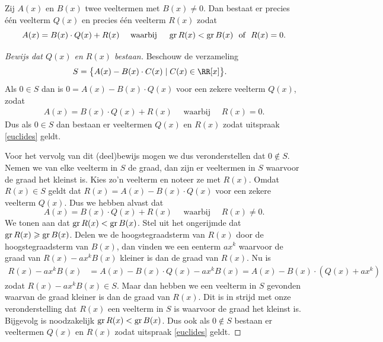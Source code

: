 \documentclass{ximera}
\begin{document}
\begin{stelling}
Zij $A(x)$ en $B(x)$ twee veeltermen met $B(x) \neq 0$. Dan bestaat er precies \'e\'en veelterm $Q(x)$ en precies \'e\'en veelterm $R(x)$ zodat
\begin{equation} \label{euclides}
A(x) = B(x)\cdot Q(x) + R(x) \quad \text{ waarbij } \quad \operatorname{gr} R(x) < \operatorname{gr} B(x) \,\, \text{ of } \,\, R(x) = 0.
\end{equation}
\end{stelling}
\begin{Uitbreiding}
\begin{proof}[Bewijs dat $Q(x)$ en $R(x)$ bestaan] Beschouw de verzameling 
\begin{align*}
S & = \bigl\{ A(x) - B(x)\cdot C(x) \mid C(x) \in \RR[x] \bigr\}.  
\end{align*}
Als $0 \in S$ dan is $0 = A(x) - B(x)\cdot Q(x)$ voor een zekere veelterm $Q(x)$, zodat \begin{align*}
A(x) = B(x)\cdot Q(x) + R(x) \quad \text{ waarbij } \quad R(x) = 0.
\end{align*}
Dus als $0 \in S$ dan bestaan er veeltermen $Q(x)$ en $R(x)$ zodat uitspraak \eqref{euclides} geldt. 

Voor het vervolg van dit (deel)bewijs mogen we dus veronderstellen dat $0 \not\in S$. Nemen we van elke veelterm in $S$ de graad, dan zijn er veeltermen in $S$ waarvoor de graad het kleinst is. Kies zo'n veelterm en noteer ze met $R(x)$. Omdat $R(x) \in S$ geldt dat $R(x) = A(x) - B(x)\cdot Q(x)$ voor een zekere veelterm $Q(x)$. Dus we hebben alvast dat
\[
A(x) = B(x)\cdot Q(x) + R(x) \quad \text{ waarbij } \quad R(x) \neq 0.
\]
We tonen aan dat $\operatorname{gr} R(x) < \operatorname{gr} B(x)$. Stel uit het ongerijmde dat $\operatorname{gr} R(x) \geqslant \operatorname{gr} B(x)$. Delen we de hoogstegraadsterm van $R(x)$ door de hoogstegraadsterm van $B(x)$, dan vinden we een eenterm $ax^k$ waarvoor de graad van $R(x) - ax^k B(x)$ kleiner is dan de graad van $R(x)$. Nu is
\begin{align*}
R(x) - ax^k B(x) & = A(x) - B(x)\cdot Q(x) - ax^k B(x) = A(x) - B(x)\cdot (Q(x) + ax^k) 
\end{align*}
zodat $R(x) - ax^k B(x) \in S$. Maar dan hebben we een veelterm in $S$ gevonden waarvan de graad kleiner is dan de graad van $R(x)$. Dit is in strijd  met onze veronderstelling dat $R(x)$ een veelterm in $S$ is waarvoor de graad het kleinst is. Bijgevolg is noodzakelijk $\operatorname{gr} R(x) < \operatorname{gr} B(x)$. Dus ook als $0 \not\in S$ bestaan er veeltermen $Q(x)$ en $R(x)$ zodat uitspraak \eqref{euclides} geldt.
\end{proof}
\end{Uitbreiding}
\end{document}
